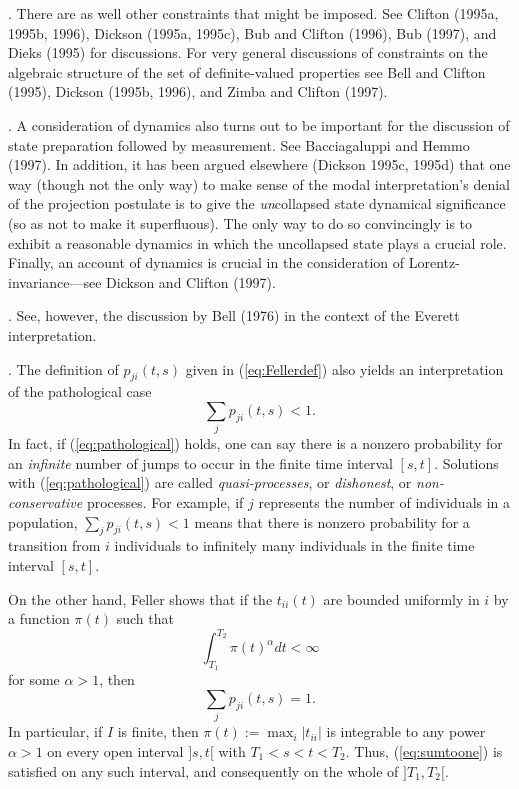 \documentclass[12pt]{article}
\newcommand{\be}{\begin{equation}}
\newcommand{\ee}{\end{equation}}
\newcommand{\abs}[1]{\left|#1\right|}
\begin{document}
\vspace*{12pt}

. There are as well other constraints that might be imposed.
See Clifton (1995a, 1995b, 1996), Dickson (1995a, 1995c), Bub and 
Clifton (1996), Bub (1997), and Dieks (1995) for discussions.  For 
very general discussions of constraints on the algebraic structure of 
the set of definite-valued properties see Bell and Clifton (1995), 
Dickson (1995b, 1996), and Zimba and Clifton (1997).

\vspace*{12pt}

.  A consideration of dynamics also turns out to be
important for the discussion of state preparation followed by 
measurement.  See Bacciagaluppi and Hemmo (1997).  In addition, it has 
been argued elsewhere (Dickson 1995c, 1995d) that one way (though not 
the only way) to make sense of the modal interpretation's denial of 
the projection postulate is to give the {\it un}collapsed state 
dynamical significance (so as not to make it superfluous).  The only 
way to do so convincingly is to exhibit a reasonable dynamics in which 
the uncollapsed state plays a crucial role.  Finally, an account of 
dynamics is crucial in the consideration of Lorentz-invariance---see 
Dickson and Clifton (1997).

\vspace*{12pt}

. See, however, the discussion by Bell (1976) in the context
of the Everett interpretation.

\vspace*{12pt}

.  The definition of $p_{ji}(t,s)$ given in
(\ref{eq:Fellerdef}) also yields an interpretation of the pathological 
case
\be
  \label{eq:pathological}
  \sum_j p_{ji}(t,s)<1.
\ee
In fact, if (\ref{eq:pathological}) holds, one can say there is a 
nonzero probability for an {\em infinite} number of jumps to occur in 
the finite time interval $[s,t]$.  Solutions with 
(\ref{eq:pathological}) are called {\em quasi-processes}, or {\em 
dishonest}, or {\em non-conservative} processes.  For example, if $j$ 
represents the number of individuals in a population, $\sum_j 
p_{ji}(t,s)<1$ means that there is nonzero probability for a 
transition from $i$ individuals to infinitely many individuals in the 
finite time interval $[s,t]$.

On the other hand, Feller shows that if the $t_{ii}(t)$ are
bounded uniformly in $i$ by a function $\pi(t)$ such that
\be
  \int_{T_1}^{T_2}\pi(t)^{\alpha}dt<\infty
\ee
for some $\alpha>1$, then
\be
  \sum_j p_{ji}(t,s)=1.
  \label{eq:sumtoone}
\ee
In particular, if $I$ is finite, then ${\displaystyle 
\pi(t):=\max_i\abs{t_{ii}}}$ is integrable to any power $\alpha>1$ on 
every open interval $]s,t[$ with $T_1<s<t<T_2$.  Thus, 
(\ref{eq:sumtoone}) is satisfied on any such interval, and 
consequently on the whole of $]T_1,T_2[$.
\end{document}

